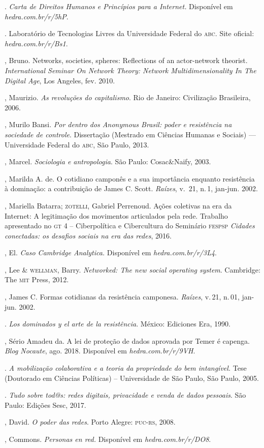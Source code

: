 \begin{bibliohedra}
\titidem. \textit{Carta de Direitos Humanos e Princípios para
a Internet.} Disponível em \textit{hedra.com.br/r/5hP}.

. Laboratório de Tecnologias Livres da
Universidade Federal do \textsc{abc}. Site oficial: \textit{hedra.com.br/r/Bs1}.

, Bruno. Networks, societies, spheres: Reflections of an
actor-network theorist. \textit{International Seminar On Network Theory:
Network Multidimensionality In The Digital Age}, Los Angeles, fev. 2010.

, Maurizio. \textit{As revoluções do capitalismo}. Rio de
Janeiro: Civilização Brasileira, 2006.

, Murilo Bansi. \textit{Por dentro dos Anonymous Brasil: poder e
resistência na sociedade de controle}. Dissertação (Mestrado em Ciências
Humanas e Sociais) --- Universidade Federal do \textsc{abc}, São Paulo, 2013.

, Marcel. \textit{Sociologia e antropologia}. São Paulo: Cosac\&Naify, 2003.

, Marilda A. de. O cotidiano camponês e a sua importância enquanto
resistência à dominação: a contribuição de James C. Scott.
\textit{Raízes}, v.\, 21, n.\,1, jan-jun. 2002.

, Mariella Batarra; \textsc{zotelli}, Gabriel Perrenoud. Ações
coletivas na era da Internet: A legitimação dos movimentos articulados
pela rede. Trabalho apresentado no \textsc{gt} 4 -- Ciberpolítica e Cibercultura
do Seminário \textsc{fespsp} \textit{Cidades conectadas: os desafios sociais na era das
redes}, 2016.

, El. \textit{Caso Cambridge Analytica.} Disponível em \textit{hedra.com.br/r/3L4}.

, Lee \& \textsc{wellman}, Barry. \textit{Networked: The new social
operating system}. Cambridge: The \textsc{mit} Press, 2012.

, James C. Formas cotidianas da resistência camponesa.
\textit{Raízes}, v.\,21, n.\,01, jan-jun. 2002.

\titidem. \textit{Los dominados y el arte de la resistência}.
México: Ediciones Era, 1990.

, Sério Amadeu da. A lei de proteção de dados aprovada
por Temer é capenga. \textit{Blog Nocaute}, ago. 2018. Disponível em \textit{hedra.com.br/r/9VH}.

\titidem. \textit{A mobilização colaborativa e a
teoria da propriedade do bem intangível.} Tese (Doutorado em Ciências
Políticas) -- Universidade de São Paulo, São Paulo, 2005.

\titidem. \textit{Tudo sobre tod@s: redes digitais,
privacidade e venda de dados pessoais}. São Paulo: Edições Sesc, 2017.

, David. \textit{O poder das redes}. Porto Alegre: \textsc{puc-rs}, 2008.

, Commons. \textit{Personas en red.} Disponível em \textit{hedra.com.br/r/DO8}.
\end{bibliohedra}

